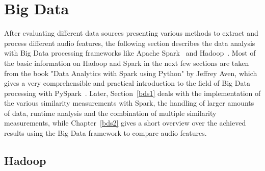 
\section{Big Data}\label{bdf}

After evaluating different data sources presenting various methods to extract and process different audio features, the following section describes the data analysis with Big Data processing frameworks like Apache Spark~\cite{spark} and Hadoop~\cite{hadoop}. Most of the basic information on Hadoop and Spark in the next few sections are taken from the book "Data Analytics with Spark using Python" by Jeffrey Aven, which gives a very comprehensible and practical introduction to the field of Big Data processing with PySpark~\cite{sparkbook1}. Later, Section~\ref{bds1} deals with the implementation of the various similarity measurements with Spark, the handling of larger amounts of data, runtime analysis and the combination of multiple similarity measurements, while Chapter~\ref{bds2} gives a short overview over the achieved results using the Big Data framework to compare audio features. 

\subsection{Hadoop}

